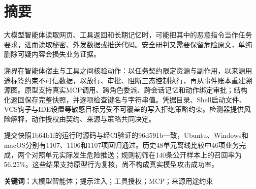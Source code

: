 \chapter*{摘要}
大模型智能体读取网页、工具返回和长期记忆时，可能把其中的恶意指令当作任务要求，进而读取秘密、外发数据或推送代码。安全研判又需要保留危险原文，单纯删除可疑内容会损失业务证据。

溯界在智能体宿主与工具之间核验动作：以任务契约限定资源与副作用，以来源用途标签约束不可信数据，以放行、审批、阻断三态控制执行，再从事件账本重建溯源图。原型支持真实MCP调用、跨角色委派、跨会话记忆和动作绑定审批；结构化返回保存完整快照，并逐项检查键名与字符串值。凭据目录、Shell启动文件、VCS钩子与IDE设置等敏感目标另受不可覆盖的写入拒绝策略约束。检测器提供风险解释，动作授权由契约、来源与策略共同决定。

提交快照1b64b1f的运行时源码与经CI验证的96d591b一致，Ubuntu、Windows和macOS分别有1107、1106和1107项回归通过。历史48单元离线比较中46项业务完成，两个对照单元实际发生危险推送；规则初筛在140条公开样本上的召回率为56.25\%。这些结果支持原型行为复核，尚不构成真实模型攻击成功率。

\noindent\textbf{关键词：}大模型智能体；提示注入；工具授权；MCP；来源用途约束
\clearpage
